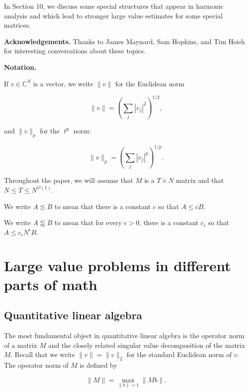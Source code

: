 \documentclass{amsart}
\newcommand{\CC}{\mathbb{C}}
\newcommand{\eps}{\epsilon}
\begin{document}
In Section 10,  we discuss some special structures that appear in harmonic analysis and which lead to stronger large value estimates for some special matrices.



\vskip10pt

{\bf Acknowledgements.}  Thanks to James Maynard,  Sam Hopkins,  and Tim Hsieh for interesting conversations about these topics.


\vskip10pt

{\bf Notation. }


\vskip10pt

If $v \in \CC^N$ is a vector,  we write $\| v \|$ for the Euclidean norm

$$ \| v \| = \left( \sum_j |v_j|^2 \right)^{1/2}, $$

and $\| v \|_p$ for the $\ell^p$ norm:

$$ \| v \|_p = \left( \sum_j |v_j|^p \right)^{1/p}.$$

Throughout the paper, we will assume that $M$ is a $T \times N$ matrix and that $N \le T \le N^{O(1)}$.  

We write $A \lesssim B$ to mean that there is a constant $c$ so that $A \le c B$.   

We write $A \lessapprox B$ to mean that for every $\eps > 0$,  there is a constant $c_\eps$ so that $A \le c_\eps N^\eps B$.  







\section{Large value problems in different parts of math}

\subsection{Quantitative linear algebra}

The most fundamental object in quantitative linear algebra is the operator norm of a matrix $M$ and the closely related singular value decomposition of the matrix $M$.   Recall that we write $\| v \| = \| v \|_2$ for the standard Euclidean norm of $v$.   The operator norm of $M$ is defined by

\begin{equation}
\label{opernorm} \| M \| =  \max_{\| b \| =1} \| Mb \|. 
\end{equation}
\end{document}
